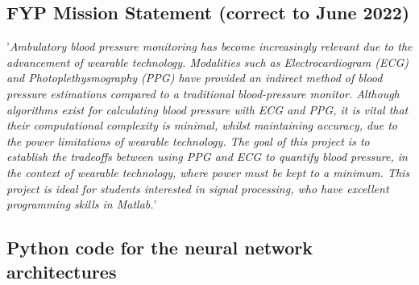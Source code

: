 \subsection*{FYP Mission Statement (correct to June 2022)}
'\emph{Ambulatory blood pressure monitoring has become increasingly 
relevant due to the advancement of wearable technology. 
Modalities such as Electrocardiogram (ECG) and Photoplethysmography 
(PPG) have provided an indirect method of blood pressure estimations 
compared to a traditional blood-pressure monitor. Although algorithms 
exist for calculating blood pressure with ECG and PPG, it is vital 
that their computational complexity is minimal, whilst maintaining 
accuracy, due to the power limitations of wearable technology. The 
goal of this project is to establish the tradeoffs between using 
PPG and ECG to quantify blood pressure, in the context of wearable
 technology, where power must be kept to a minimum. This project is
  ideal for students interested in signal processing, who have 
  excellent programming skills in Matlab.}'

\subsection*{Python code for the neural network architectures}
